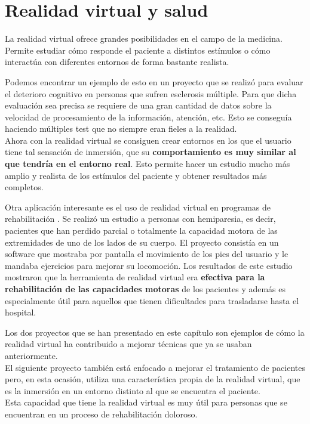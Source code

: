 \documentclass[twoside, 11pt]{epstfg}
\begin{document}
\section{Realidad virtual y salud}
\label{sec:VR y salud}

La realidad virtual ofrece grandes posibilidades en el campo de la medicina. Permite estudiar cómo responde el paciente a distintos estímulos o cómo interactúa con diferentes entornos de forma bastante realista.

Podemos encontrar un ejemplo de esto en un proyecto que se realizó para evaluar el deterioro cognitivo en personas que sufren esclerosis múltiple. Para que dicha evaluación sea precisa se requiere de una gran cantidad de datos sobre la velocidad de procesamiento de la información, atención, etc. Esto se conseguía haciendo múltiples test que no siempre eran fieles a la realidad.\\
Ahora con la realidad virtual se consiguen crear entornos en los que el usuario tiene tal sensación de inmersión, que su \textbf{comportamiento es muy similar al que tendría en el entorno real}. Esto permite hacer un estudio mucho más amplio y realista de los estímulos del paciente y obtener resultados más completos.\cite{LamargueHamel201594}


Otra aplicación interesante es el uso de realidad virtual en programas de rehabilitación \cite{hu2016virtual} \cite{kaliki2013evaluation}.
Se realizó un estudio a personas con hemiparesia, es decir, pacientes que han perdido parcial o totalmente la capacidad motora de las extremidades de uno de los lados de su cuerpo. El proyecto consistía en un software que mostraba por pantalla el movimiento de los pies  del usuario y le mandaba ejercicios para mejorar su locomoción. 
Los resultados de este estudio mostraron que la herramienta de realidad virtual era \textbf{efectiva para la rehabilitación de las capacidades motoras} de los pacientes y además es especialmente útil para aquellos que tienen dificultades para trasladarse hasta el hospital.\cite{Llorens2015418}

Los dos proyectos que se han presentado en este capítulo son ejemplos de cómo la realidad virtual ha contribuido a mejorar técnicas que ya se usaban anteriormente.\\
El siguiente proyecto también está enfocado a mejorar el tratamiento de pacientes pero, en esta ocasión, utiliza una característica propia de la realidad virtual, que es la inmersión en un entorno distinto al que se encuentra el paciente.\\
Esta capacidad que tiene la realidad virtual es muy útil para personas que se encuentran en un proceso de rehabilitación doloroso.
\end{document}
